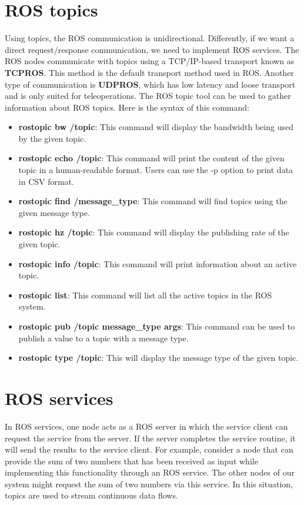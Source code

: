 \documentclass[../../main]{subfiles}
\begin{document}
\section{ROS topics}
Using topics, the ROS communication is unidirectional. Differently, if we want a direct
request/response communication, we need to implement ROS services.
The ROS nodes communicate with topics using a TCP/IP-based transport known as \textbf{TCPROS}. This method is the default transport method used in ROS. Another type of communication is \textbf{UDPROS}, which has low latency and loose transport and is only suited for teleoperations.
The ROS topic tool can be used to gather information about ROS topics. Here is the syntax of this command:
\begin{itemize}
    \item \textbf{rostopic bw /topic}: This command will display the bandwidth being used by the given topic.
    \item \textbf{rostopic echo /topic}: This command will print the content of the given topic in a human-readable format. Users can use the -p option to print data in CSV format.
    \item \textbf{rostopic find /message\_type}: This command will find topics using the given message type.
    \item \textbf{rostopic hz /topic}: This command will display the publishing rate of the given topic.
    \item \textbf{rostopic info /topic}: This command will print information about an active topic.
    \item \textbf{rostopic list}: This command will list all the active topics in the ROS system.
    \item \textbf{rostopic pub /topic message\_type args}: This command can be used to publish a value to a topic with a message type.
    \item \textbf{rostopic type /topic}: This will display the message type of the given topic.
\end{itemize}

\section{ROS services}
In ROS services, one node acts as a ROS server in which the service client can request the service from the server. If the server completes the service routine, it will send the results to the service client. For example, consider a node that can provide the sum of two numbers that has been received as input while implementing this functionality through an ROS service. The other nodes of our system might request the sum of two numbers via this service. In this situation, topics are used to stream continuous data flows.
\end{document}
